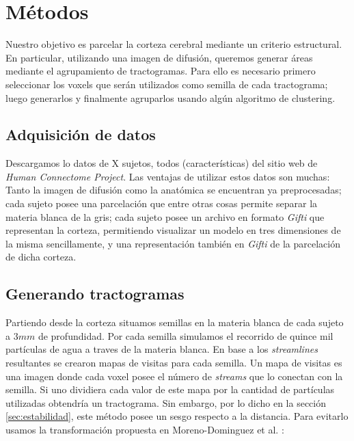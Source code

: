 \chapter{M\'etodos}

Nuestro objetivo es parcelar la corteza cerebral mediante un criterio estructural.
En particular, utilizando una imagen de difusi\'on, queremos generar \'areas 
mediante el agrupamiento de tractogramas. Para ello es necesario primero seleccionar
los voxels que ser\'an utilizados como semilla de cada tractograma; luego generarlos
y finalmente agruparlos usando alg\'un algoritmo de clustering.  \\

\section{Adquisici\'on de datos}

Descargamos lo datos de X sujetos, todos (caracter\'isticas) del sitio web 
de \textit{Human Connectome Project}. Las ventajas de utilizar estos datos son muchas:
Tanto la imagen de difusi\'on como la anat\'omica se encuentran ya preprocesadas;
cada sujeto posee una parcelaci\'on que entre otras cosas permite separar la materia
blanca de la gris; cada sujeto posee un archivo en formato \textit{Gifti} que
representan la corteza, permitiendo visualizar un modelo en tres dimensiones
de la misma sencillamente, y una representaci\'on tambi\'en en \textit{Gifti} 
de la parcelaci\'on de dicha corteza. \\





\section{Generando tractogramas}

Partiendo desde la corteza situamos semillas en la materia blanca de cada 
sujeto a $3mm$ de profundidad. Por cada semilla simulamos el recorrido de quince
mil part\'iculas de agua a traves de la materia blanca. En base a los \textit{streamlines}
resultantes se crearon mapas de visitas para cada semilla. Un mapa de visitas es
una imagen donde cada voxel posee el n\'umero de \textit{streams} que lo conectan
con la semilla. Si uno dividiera cada valor de este mapa por la cantidad de
part\'iculas utilizadas obtendr\'ia un tractograma. Sin embargo, por lo dicho en
la secci\'on \ref{sec:estabilidad}, este m\'etodo posee un sesgo respecto a la
distancia. Para evitarlo usamos la transformaci\'on propuesta en Moreno-Dominguez et
al. \cite{Moreno-Dominguez2014}:

